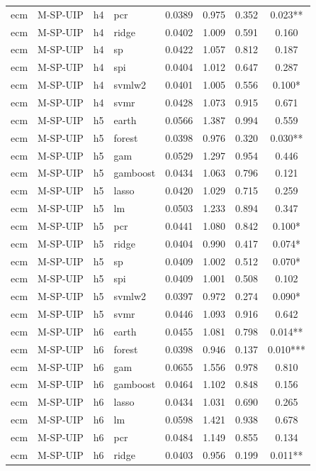 \begin{ThreePartTable}
\begin{longtable}[t]{llclcccc}
ecm & M-SP-UIP & h4 & pcr & 0.0389 & 0.975 & 0.352 & 0.023**\\
ecm & M-SP-UIP & h4 & ridge & 0.0402 & 1.009 & 0.591 & 0.160\\
ecm & M-SP-UIP & h4 & sp & 0.0422 & 1.057 & 0.812 & 0.187\\
ecm & M-SP-UIP & h4 & spi & 0.0404 & 1.012 & 0.647 & 0.287\\
ecm & M-SP-UIP & h4 & svmlw2 & 0.0401 & 1.005 & 0.556 & 0.100*\\
ecm & M-SP-UIP & h4 & svmr & 0.0428 & 1.073 & 0.915 & 0.671\\
\addlinespace
ecm & M-SP-UIP & h5 & earth & 0.0566 & 1.387 & 0.994 & 0.559\\
ecm & M-SP-UIP & h5 & forest & 0.0398 & 0.976 & 0.320 & 0.030**\\
ecm & M-SP-UIP & h5 & gam & 0.0529 & 1.297 & 0.954 & 0.446\\
ecm & M-SP-UIP & h5 & gamboost & 0.0434 & 1.063 & 0.796 & 0.121\\
ecm & M-SP-UIP & h5 & lasso & 0.0420 & 1.029 & 0.715 & 0.259\\
ecm & M-SP-UIP & h5 & lm & 0.0503 & 1.233 & 0.894 & 0.347\\
ecm & M-SP-UIP & h5 & pcr & 0.0441 & 1.080 & 0.842 & 0.100*\\
ecm & M-SP-UIP & h5 & ridge & 0.0404 & 0.990 & 0.417 & 0.074*\\
ecm & M-SP-UIP & h5 & sp & 0.0409 & 1.002 & 0.512 & 0.070*\\
ecm & M-SP-UIP & h5 & spi & 0.0409 & 1.001 & 0.508 & 0.102\\
ecm & M-SP-UIP & h5 & svmlw2 & 0.0397 & 0.972 & 0.274 & 0.090*\\
ecm & M-SP-UIP & h5 & svmr & 0.0446 & 1.093 & 0.916 & 0.642\\
\addlinespace
ecm & M-SP-UIP & h6 & earth & 0.0455 & 1.081 & 0.798 & 0.014**\\
ecm & M-SP-UIP & h6 & forest & 0.0398 & 0.946 & 0.137 & 0.010***\\
ecm & M-SP-UIP & h6 & gam & 0.0655 & 1.556 & 0.978 & 0.810\\
ecm & M-SP-UIP & h6 & gamboost & 0.0464 & 1.102 & 0.848 & 0.156\\
ecm & M-SP-UIP & h6 & lasso & 0.0434 & 1.031 & 0.690 & 0.265\\
ecm & M-SP-UIP & h6 & lm & 0.0598 & 1.421 & 0.938 & 0.678\\
ecm & M-SP-UIP & h6 & pcr & 0.0484 & 1.149 & 0.855 & 0.134\\
ecm & M-SP-UIP & h6 & ridge & 0.0403 & 0.956 & 0.199 & 0.011**\\

\end{longtable}
\end{ThreePartTable}
